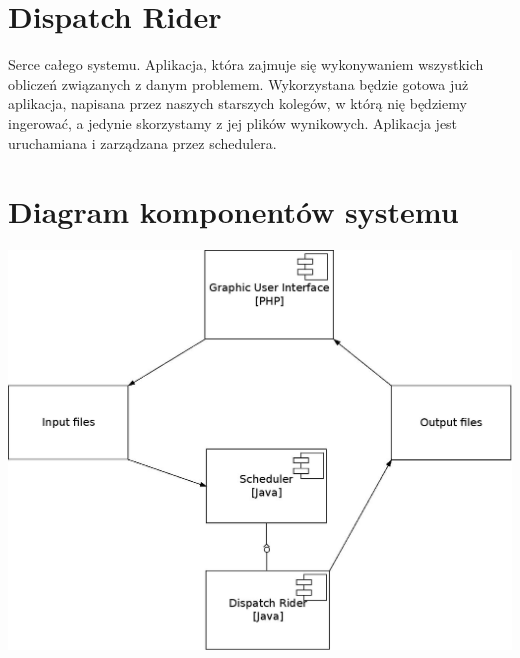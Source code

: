 \section{Dispatch Rider}
Serce całego systemu. Aplikacja, która zajmuje się wykonywaniem wszystkich obliczeń związanych z danym problemem.
Wykorzystana będzie gotowa już aplikacja, napisana przez naszych starszych kolegów, w którą nię będziemy
ingerować, a jedynie skorzystamy z jej plików wynikowych. Aplikacja jest uruchamiana i zarządzana przez schedulera.

\section{Diagram komponentów systemu}

\begin{center}
\includegraphics[scale=0.35]{imgs/IO.jpeg}
\end{center}